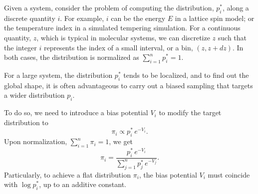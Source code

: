 \documentclass[reprint, floatfix]{revtex4-1}
\begin{document}
Given a system,
consider the problem of computing
the distribution, $p^*_i$,
along a discrete quantity $i$.
%
%
For example, $i$ can be the energy $E$
in a lattice spin model; or the temperature index
in a simulated tempering simulation.
%
For a continuous quantity, $z$,
which is typical in molecular systems,
we can discretize $z$
such that the integer $i$ represents
the index of a small interval, or a bin,
$(z, z + dz)$.
%
In both cases,
the distribution is normalized as
$\sum_{i = 1}^n p^*_i = 1$.



For a large system,
the distribution $p^*_i$ tends to
be localized,
%
and to find out the global shape,
it is often advantageous to carry out
a biased sampling that targets
a wider distribution $p_i$.
%



To do so, we need to introduce a bias potential $V_i$
to modify the target distribution to
%
\begin{equation}
  \pi_i \propto p^*_i \, e^{-V_i}.
  \label{eq:pi_p_phi1}
\end{equation}
%
Upon normalization, $\sum_{i = 1}^n \pi_i = 1$,
we get
%
\begin{equation}
  \pi_i
  =
  \frac{                p^*_i \, e^{-V_i} }
       { \sum_{j = 1}^n p^*_j \, e^{-V_j} }
  .
  \label{eq:pi_p_phi}
\end{equation}
%
Particularly,
to achieve a flat distribution $\pi_i$,
the bias potential $V_i$
must coincide with $\log p^*_i$,
up to an additive constant.
\end{document}
